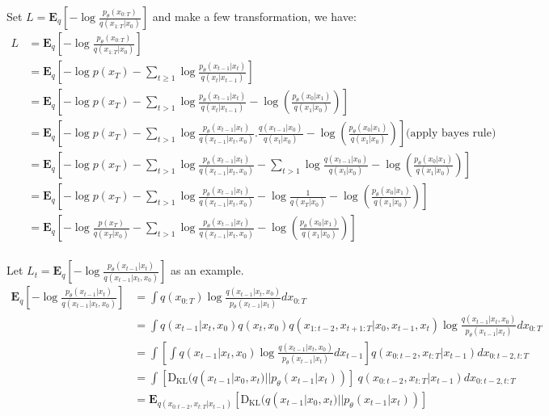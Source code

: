 \documentclass[11pt, oneside]{article}   	%
\begin{document}
Set $L = \mathbf{E}_{q}\left[-\log{\frac{p_{\theta}(x_{0:T})}{q(x_{1:T}|x_{0})}}\right]$ and make a few transformation, we have:
\begin{align*}
	L
	&=\mathbf{E}_{q}\left[-\log{\frac{p_{\theta}(x_{0:T})}{q(x_{1:T}|x_{0})}}\right] \\
	&=\mathbf{E}_{q}\left[ -\log{p(x_{T})} - \sum_{t\geq1} \log \frac{p_{\theta}(x_{t-1}|x_{t})}{q(x_{t}|x_{t-1})} \right] \\
	&=\mathbf{E}_{q}\left[ -\log{p(x_{T})} - \sum_{t>1} \log \frac{p_{\theta}(x_{t-1}|x_{t})}{q(x_{t}|x_{t-1})} - \log(\frac{p_{\theta}(x_{0}|x_{1})}{q(x_{1}|x_{0})})\right] \\
	&=\mathbf{E}_{q}\left[ -\log{p(x_{T})} - \sum_{t>1} \log \frac{p_{\theta}(x_{t-1}|x_{t})}{q(x_{t-1}|x_{t}, x_{0})}.\frac{q(x_{t-1}|x_{0})}{q(x_{t}|x_{0})} - \log(\frac{p_{\theta}(x_{0}|x_{1})}{q(x_{1}|x_{0})})\right] \text{(apply bayes rule)} \\
	&=\mathbf{E}_{q}\left[ -\log{p(x_{T})} - \sum_{t>1} \log \frac{p_{\theta}(x_{t-1}|x_{t})}{q(x_{t-1}|x_{t}, x_{0})} -\sum_{t>1}\log\frac{q(x_{t-1}|x_{0})}{q(x_{t}|x_{0})} - \log(\frac{p_{\theta}(x_{0}|x_{1})}{q(x_{1}|x_{0})})\right] \\
	&=\mathbf{E}_{q}\left[ -\log{p(x_{T})} - \sum_{t>1} \log \frac{p_{\theta}(x_{t-1}|x_{t})}{q(x_{t-1}|x_{t}, x_{0})} - \log\frac{1}{q(x_{T}|x_{0})} - \log(\frac{p_{\theta}(x_{0}|x_{1})}{q(x_{1}|x_{0})})\right] \\
	&=\mathbf{E}_{q}\left[ -\log\frac{p(x_{T})}{q(x_{T}|x_{0})} - \sum_{t>1} \log \frac{p_{\theta}(x_{t-1}|x_{t})}{q(x_{t-1}|x_{t}, x_{0})} - \log(\frac{p_{\theta}(x_{0}|x_{1})}{q(x_{1}|x_{0})})\right] \\
\end{align*}

Let $ L_{t} = \mathbf{E}_{q}\left[- \log \frac{p_{\theta}(x_{t-1}|x_{t})}{q(x_{t-1}|x_{t}, x_{0})} \right] $ as an example.
\begin{align*}
	\mathbf{E}_{q}\left[- \log \frac{p_{\theta}(x_{t-1}|x_{t})}{q(x_{t-1}|x_{t}, x_{0})} \right] 
	&= \int q(x_{0:T})\log \frac{q(x_{t-1}|x_{t}, x_{0})}{p_{\theta}(x_{t-1}|x_{t})} dx_{0:T} \\
	&= \int q(x_{t-1}|x_{t}, x_{0}) q(x_{t}, x_{0}) q(x_{1:t-2}, x_{t+1:T}|x_{0}, x_{t-1}, x_{t}) \log \frac{q(x_{t-1}|x_{t}, x_{0})}{p_{\theta}(x_{t-1}|x_{t})} dx_{0:T} \\
	&= \int \left[ \int q(x_{t-1}|x_{t}, x_{0}) \log \frac{q(x_{t-1}|x_{t}, x_{0})}{p_{\theta}(x_{t-1}|x_{t})} dx_{t-1}\right] q(x_{0:t-2}, x_{t:T}|x_{t-1}) dx_{0:t-2, t:T} \\
	&= \int [\mathrm{D}_{\mathrm{KL}}(q(x_{t-1}| x_{0}, x_{t}) || p_{\theta}(x_{t-1}|x_{t}))]\: q(x_{0:t-2}, x_{t:T}|x_{t-1}) dx_{0:t-2, t:T} \\
	&= \mathbf{E}_{q(x_{0:t-2}, x_{t:T}|x_{t-1})} [\mathrm{D}_{\mathrm{KL}}(q(x_{t-1}| x_{0}, x_{t}) || p_{\theta}(x_{t-1}|x_{t}))]
\end{align*}
\end{document}
